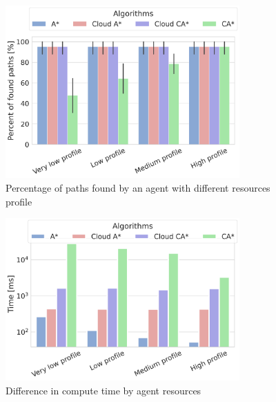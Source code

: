 \begin{figure}[H]
    \centering
    \includegraphics[width=0.8\textwidth]{pictures/compare_profiles_paths.png}
    \caption{Percentage of paths found by an agent with different resources profile}
    \label{fig:compare_profiles_paths}
\end{figure}
\begin{figure}[H]
    \centering
    \includegraphics[width=0.8\textwidth]{pictures/compare_profiles_log.png}
    \caption{Difference in compute time by agent resources}
    \label{fig:compare_profiles_log}
\end{figure}